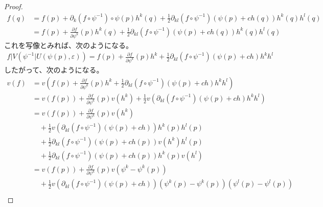 \documentclass[dvipdfmx]{jsarticle}
\begin{document}
\begin{proof}
  \begin{align*}
    f\left(q\right) &=f\left(p\right) +\partial_k \left(f\circ \psi^{-1}\right) \circ \psi\left(p\right) h^k \left(q\right) +\frac{1}{2}\partial_{kl} \left(f\circ \psi^{-1}\right) \left(\psi\left(p\right) +ch\left(q\right)\right) h^k \left(q\right) h^l \left(q\right) \\
    &=f\left(p\right) +\frac{\partial f}{\partial \psi^k } \left(p\right) h^k \left(q\right) +\frac{1}{2}\partial_{kl} \left(f\circ \psi^{-1}\right) \left(\psi\left(p\right) +ch\left(q\right)\right) h^k \left(q\right) h^l \left(q\right) 
  \end{align*}
  これを写像とみれば、次のようになる。
  \begin{align*}
    f|V\left(\psi^{-1}|U\left(\psi\left(p\right),\varepsilon\right)\right) =f\left(p\right) +\frac{\partial f}{\partial \psi^k } \left(p\right) h^k +\frac{1}{2}\partial_{kl} \left(f\circ \psi^{-1}\right) \left(\psi\left(p\right) +ch \right) h^k h^l 
  \end{align*} 
  したがって、次のようになる。
  \begin{align*}
    v\left(f\right) &=v\left(f\left(p\right) +\frac{\partial f}{\partial \psi^k } \left(p\right) h^k +\frac{1}{2}\partial_{kl} \left(f\circ \psi^{-1}\right) \left(\psi\left(p\right) +ch \right) h^k h^l \right) \\
    &=v\left(f\left(p\right) \right)+\frac{\partial f}{\partial \psi^k } \left(p\right) v\left(h^k \right) +\frac{1}{2}v\left(\partial_{kl} \left(f\circ \psi^{-1}\right) \left(\psi\left(p\right) +ch \right) h^k h^l \right) \\
    &=v\left(f\left(p\right) \right)+\frac{\partial f}{\partial \psi^k } \left(p\right) v\left(h^k \right) \\
    &\quad +\frac{1}{2}v\left(\partial_{kl} \left(f\circ \psi^{-1}\right) \left(\psi\left(p\right) +ch \right) \right) h^k \left(p\right) h^l \left(p\right) \\
    &\quad +\frac{1}{2}\partial_{kl} \left(f\circ \psi^{-1}\right) \left(\psi\left(p\right) +ch\left(p\right) \right) v\left(h^k\right) h^l \left(p\right) \\
    &\quad +\frac{1}{2}\partial_{kl} \left(f\circ \psi^{-1}\right) \left(\psi\left(p\right) +ch\left(p\right) \right) h^k \left(p\right) v\left(h^l\right) \\
    &=v\left(f\left(p\right) \right)+\frac{\partial f}{\partial \psi^k } \left(p\right) v\left(\psi^k -\psi^k  \left(p\right) \right) \\
    &\quad +\frac{1}{2}v\left(\partial_{kl} \left(f\circ \psi^{-1}\right) \left(\psi\left(p\right) +ch \right) \right) \left(\psi^k \left(p\right) -\psi^k  \left(p\right)\right) \left(\psi^l \left(p\right) -\psi^l \left(p\right)\right)\\

\end{align*}
\end{proof}
\end{document}
